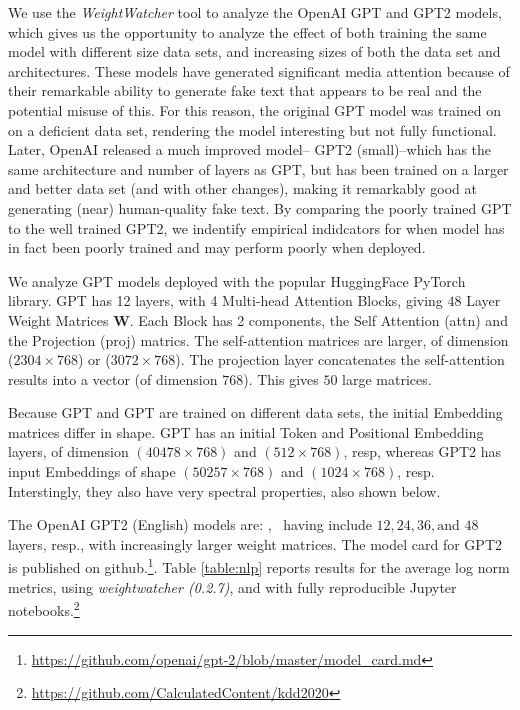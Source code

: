 We use the \emph{WeightWatcher} tool to analyze the OpenAI GPT and GPT2 models, which gives us
the opportunity to analyze the effect of both training the same model with different size data sets,
and increasing sizes of both the data set and architectures.
These models have generated significant media attention because of their remarkable ability to
 generate fake text that appears to be real and the potential misuse of this.
For this reason, the original GPT model was trained on on a deficient data set, rendering
the model interesting but not fully functional.  Later, OpenAI released a much improved model--
GPT2 (small)--which has the same architecture and number of layers as GPT, but has
been trained on a larger and better data set (and with other changes), making it
remarkably good at generating (near) human-quality fake text.  
By comparing the poorly trained GPT to the well trained GPT2, we
indentify empirical indidcators for when  model has in fact
been poorly trained and may perform poorly when deployed.

We analyze GPT models deployed with the popular HuggingFace PyTorch library.
GPT has 12 layers, with 4 Multi-head Attention Blocks, giving $48$ Layer Weight Matrices $\mathbf{W}$.
Each Block has 2 components, the Self Attention (attn) and the Projection (proj) matrics.  
The self-attention  matrices are larger, of dimension ($2304\times 768$) or ($3072\times 768$).
The projection layer concatenates the self-attention results into a vector (of dimension $768$).
This gives $50$ large matrices.

Because GPT and GPT are trained on different data sets, the initial Embedding matrices differ in shape.
GPT  has an initial Token and Positional Embedding layers, of dimension
$(40478\times 768)$ and $(512\times 768)$, resp, whereas GPT2 has input Embeddings of shape
$(50257\times 768)$ and $(1024\times 768)$, resp.  Interstingly, they also have very spectral properties,
also shown below.

The OpenAI GPT2 (English) models are: , \
having include $12, 24, 36, \text{and }48$ layers, resp., with increasingly larger weight matrices.
The model card for GPT2 is published on github.\footnote{\url{https://github.com/openai/gpt-2/blob/master/model_card.md}}.
Table \ref{table:nlp} reports results for the average log norm metrics, using \emph{weightwatcher (0.2.7)},
and with fully reproducible Jupyter notebooks.\footnote{\url{https://github.com/CalculatedContent/kdd2020}}

